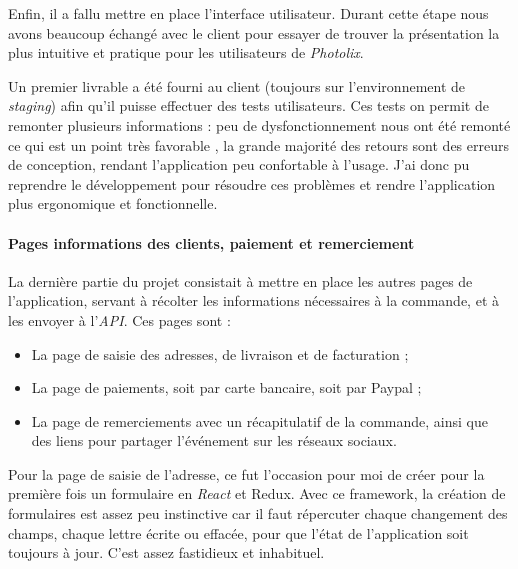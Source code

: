 \bigskip

Enfin, il a fallu mettre en place l'interface utilisateur. Durant cette
étape nous avons beaucoup échangé avec le client pour essayer de trouver
la présentation la plus intuitive et pratique pour les utilisateurs de
\emph{Photolix}.

Un premier livrable a été fourni au client (toujours sur l'environnement
de \emph{staging}) afin qu'il puisse effectuer des tests utilisateurs.
Ces tests on permit de remonter plusieurs informations : peu de
dysfonctionnement nous ont été remonté ce qui est un point très
favorable , la grande majorité des retours sont des erreurs de
conception, rendant l'application peu confortable à l'usage. J'ai donc
pu reprendre le développement pour résoudre ces problèmes et rendre
l'application plus ergonomique et fonctionnelle.

\paragraph{Pages informations des clients, paiement et
remerciement}\label{pages-informations-des-clients-paiement-et-remerciement}

\bigskip

La dernière partie du projet consistait à mettre en place les autres
pages de l'application, servant à récolter les informations nécessaires
à la commande, et à les envoyer à l'\emph{API}. Ces pages sont :

\begin{itemize}
\tightlist
\item
  La page de saisie des adresses, de livraison et de facturation ;
\item
  La page de paiements, soit par carte bancaire, soit par Paypal ;
\item
  La page de remerciements avec un récapitulatif de la commande, ainsi
  que des liens pour partager l'événement sur les réseaux sociaux.
\end{itemize}

\bigskip

Pour la page de saisie de l'adresse, ce fut l'occasion pour moi de créer
pour la première fois un formulaire en \emph{React} et Redux. Avec ce
framework, la création de formulaires est assez peu instinctive car il
faut répercuter chaque changement des champs, chaque lettre écrite ou
effacée, pour que l'état de l'application soit toujours à jour. C'est
assez fastidieux et inhabituel.

\bigskip

